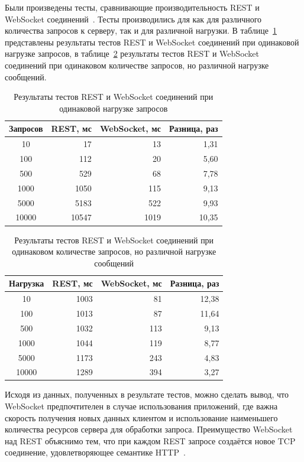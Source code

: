 Были произведены тесты, сравнивающие производительность REST и\\WebSocket соединений~\cite{http_websockets}. Тесты производились для как для различного количества запросов к серверу, так и для различной нагрузки. В таблице~\ref{tab:constant_payload} представлены результаты тестов REST и WebSocket соединений при одинаковой нагрузке запросов, в таблице~\ref{tab:increasing_payload} результаты тестов REST и WebSocket соединений при одинаковом количестве запросов, но различной нагрузке сообщений.

\begin{table}[H]
  \caption{Результаты тестов REST и WebSocket соединений при одинаковой нагрузке запросов}
  \label{tab:constant_payload}
  \begin{tabular}{|c|r|r|r|}
  \hline
  \textbf{Запросов} & \textbf{REST, мс} & \textbf{WebSocket, мс} & \textbf{Разница, раз} \\ \hline
  10    & 17    & 13   & 1,31  \\ \hline
  100   & 112   & 20   & 5,60  \\ \hline
  500   & 529   & 68   & 7,78  \\ \hline
  1000  & 1050  & 115  & 9,13  \\ \hline
  5000  & 5183  & 522  & 9,93  \\ \hline
  10000 & 10547 & 1019 & 10,35 \\ \hline
  \end{tabular}
\end{table}

\begin{table}[H]
  \caption{Результаты тестов REST и WebSocket соединений при одинаковом количестве запросов, но различной нагрузке сообщений}
  \label{tab:increasing_payload}
  \begin{tabular}{|c|r|r|r|}
  \hline
  \textbf{Нагрузка} & \textbf{REST, мс} & \textbf{WebSocket, мс} & \textbf{Разница, раз} \\ \hline
  10    & 1003 & 81  & 12,38 \\ \hline
  100   & 1013 & 87  & 11,64 \\ \hline
  500   & 1032 & 113 & 9,13  \\ \hline
  1000  & 1044 & 119 & 8,77  \\ \hline
  5000  & 1173 & 243 & 4,83  \\ \hline
  10000 & 1289 & 394 & 3,27  \\ \hline
  \end{tabular}
\end{table}

Исходя из данных, полученных в результате тестов, можно сделать вывод, что WebSocket предпочтителен в случае использования приложений, где важна скорость получения новых данных клиентом и использование наименьшего количества ресурсов сервера для обработки запроса. Преимущество WebSocket над REST объяснимо тем, что при каждом REST запросе создаётся новое TCP соединение, удовлетворяющее семантике HTTP~\cite{http_websockets}.

